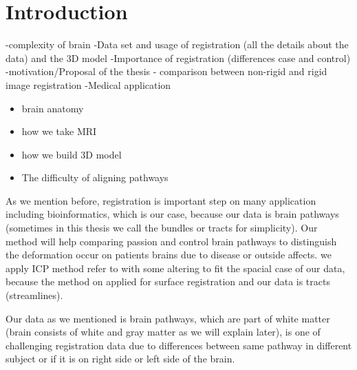 \documentclass[../structure.tex]{subfiles}
\begin{document}
\chapter{Introduction}

-complexity of brain
-Data set and usage of registration (all the details about the data) and the 3D model
-Importance of registration (differences case and control)
-motivation/Proposal of the thesis - comparison between non-rigid and rigid image registration 
-Medical application

\begin{itemize}
\item brain anatomy
\item how we take MRI
\item how we build 3D model
\item The difficulty of aligning pathways

\end{itemize}

As we mention before, registration is important step on many application including bioinformatics, which is our case, because our data is brain pathways (sometimes in this thesis we call the bundles or tracts for simplicity). Our method will help comparing passion and control brain pathways to distinguish the deformation occur on patients brains due to disease or outside affects. we apply ICP method refer to \cite{Amberg2007} with some altering to fit the spacial case of our data, because the method on \cite{Amberg2007} applied for surface registration and our data is tracts (streamlines).

Our data as we mentioned is brain pathways, which are part of white matter (brain consists of white and gray matter as we will explain later), is one of challenging registration data due to differences between same pathway in different subject or if it is on right side or left side of the brain.
\end{document}

